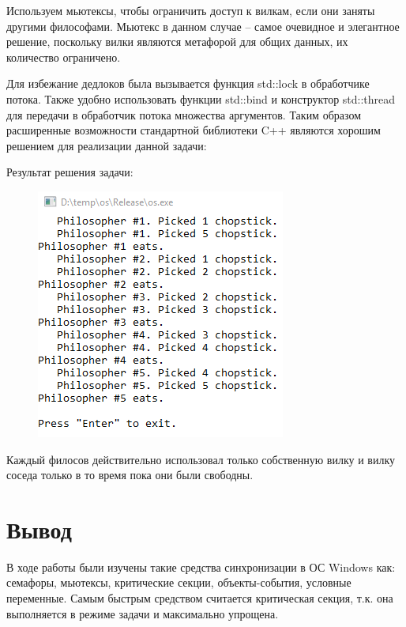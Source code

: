 \documentclass[14pt,a4paper,report]{report}
\begin{document}
Используем мьютексы, чтобы ограничить доступ к вилкам, если они заняты другими философами. Мьютекс в данном случае – самое очевидное и элегантное решение, поскольку вилки являются метафорой для общих данных, их количество ограничено.

Для избежание дедлоков была вызывается функция std::lock в обработчике потока. Также удобно использовать функции std::bind и конструктор std::thread для передачи в обработчик потока множества аргументов. Таким образом расширенные возможности стандартной библиотеки C++ являются хорошим решением для реализации данной задачи:



Результат решения задачи:

\begin{figure}[h!]
	\centering
	\includegraphics[scale = 0.90]{images/p3_1.png}
	
	\caption{}
	\label{image:18}
\end{figure}

Каждый филосов действительно использовал только собственную вилку и вилку соседа только в то время пока они были свободны. 

\clearpage

\section{Вывод}

В ходе работы были изучены такие средства синхронизации в ОС Windows как: семафоры, мьютексы, критические секции, объекты-события, условные переменные. Самым быстрым средством считается критическая секция, т.к. она выполняется в режиме задачи и максимально упрощена.
\end{document}
